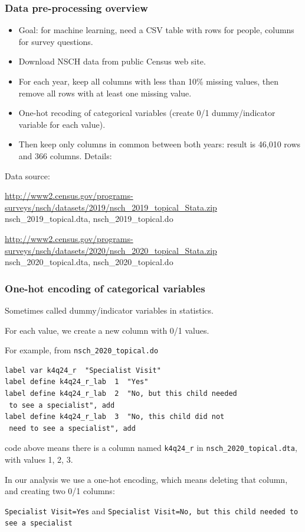 \documentclass{beamer}
\begin{document}
\begin{frame}
  \frametitle{Data pre-processing overview}

  \begin{itemize}
  \item Goal: for machine learning, need a CSV table with
    rows for people, columns for survey questions.
  \item Download NSCH data from public Census web site.
  \item For each year, keep all columns with less than
    10\% missing values, then remove all rows with at least one missing value.
  \item One-hot recoding of categorical variables (create 0/1
    dummy/indicator variable for each value).
  \item Then keep only columns in common between both years: result is
    46,010 rows and 366 columns. Details:
  \end{itemize}

  \scriptsize
  
   

Data source:

\url{http://www2.census.gov/programs-surveys/nsch/datasets/2019/nsch_2019_topical_Stata.zip} nsch\_2019\_topical.dta, nsch\_2019\_topical.do

\url{http://www2.census.gov/programs-surveys/nsch/datasets/2020/nsch_2020_topical_Stata.zip} nsch\_2020\_topical.dta, nsch\_2020\_topical.do

\end{frame} 

\begin{frame}[fragile]
  \frametitle{One-hot encoding of categorical variables}

Sometimes called dummy/indicator variables in statistics. 

For each value, we create a new column with 0/1 values.

For example, from \verb|nsch_2020_topical.do|
\begin{verbatim}
label var k4q24_r  "Specialist Visit"
label define k4q24_r_lab  1  "Yes"
label define k4q24_r_lab  2  "No, but this child needed 
 to see a specialist", add
label define k4q24_r_lab  3  "No, this child did not 
 need to see a specialist", add
\end{verbatim}
code above means there is a column named \verb|k4q24_r| in \verb|nsch_2020_topical.dta|, with values 1, 2, 3.

In our analysis we use a one-hot encoding, which means deleting that
column, and creating two 0/1 columns:

\small
\verb|Specialist Visit=Yes| and
\verb|Specialist Visit=No, but this child needed to see a specialist|

\end{frame}
\end{document}
